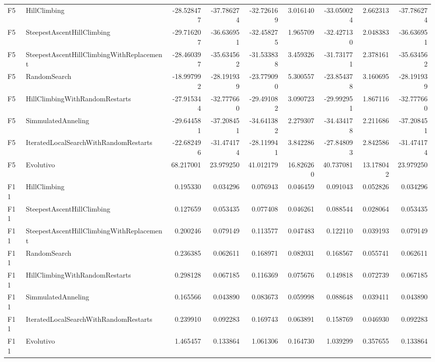 \begin{tabular}{llrrrrrrr}
F5 & HillClimbing & -28.528477 & -37.786274 & -32.726169 & 3.016140 & -33.050024 & 2.662313 & -37.786274 \\
F5 & SteepestAscentHillClimbing & -29.716207 & -36.636951 & -32.458275 & 1.965709 & -32.427130 & 2.048383 & -36.636951 \\
F5 & SteepestAscentHillClimbingWithReplacement & -28.460397 & -35.634562 & -31.533838 & 3.459326 & -31.731771 & 2.378161 & -35.634562 \\
F5 & RandomSearch & -18.997992 & -28.191939 & -23.779090 & 5.300557 & -23.854378 & 3.160695 & -28.191939 \\
F5 & HillClimbingWithRandomRestarts & -27.915344 & -32.777660 & -29.491082 & 3.090723 & -29.992951 & 1.867116 & -32.777660 \\
F5 & SimmulatedAnneling & -29.644581 & -37.208451 & -34.641382 & 2.279307 & -34.434178 & 2.211686 & -37.208451 \\
F5 & IteratedLocalSearchWithRandomRestarts & -22.682496 & -31.474174 & -28.119941 & 3.842286 & -27.848093 & 2.842586 & -31.474174 \\
F5 & Evolutivo & 68.217001 & 23.979250 & 41.012179 & 16.826260 & 40.737081 & 13.178042 & 23.979250 \\
F11 & HillClimbing & 0.195330 & 0.034296 & 0.076943 & 0.046459 & 0.091043 & 0.052826 & 0.034296 \\
F11 & SteepestAscentHillClimbing & 0.127659 & 0.053435 & 0.077408 & 0.046261 & 0.088544 & 0.028064 & 0.053435 \\
F11 & SteepestAscentHillClimbingWithReplacement & 0.200246 & 0.079149 & 0.113577 & 0.047483 & 0.122110 & 0.039193 & 0.079149 \\
F11 & RandomSearch & 0.236385 & 0.062611 & 0.168971 & 0.082031 & 0.168567 & 0.055741 & 0.062611 \\
F11 & HillClimbingWithRandomRestarts & 0.298128 & 0.067185 & 0.116369 & 0.075676 & 0.149818 & 0.072739 & 0.067185 \\
F11 & SimmulatedAnneling & 0.165566 & 0.043890 & 0.083673 & 0.059998 & 0.088648 & 0.039411 & 0.043890 \\
F11 & IteratedLocalSearchWithRandomRestarts & 0.239910 & 0.092283 & 0.169743 & 0.063891 & 0.158769 & 0.046930 & 0.092283 \\
F11 & Evolutivo & 1.465457 & 0.133864 & 1.061306 & 0.164730 & 1.039299 & 0.357655 & 0.133864 \\
\bottomrule
\end{tabular}
